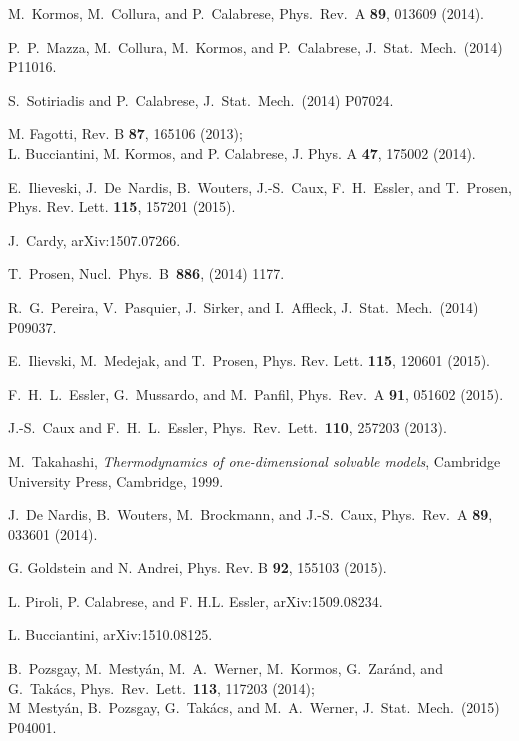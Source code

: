 \documentclass[11pt]{iopart}
\begin{document}
\begin{thebibliography}{99}
M.~Kormos, M.~Collura, and P.~Calabrese, Phys.\ Rev.\ A {\bf 89}, 013609  (2014).


P.~P.~Mazza, M.\ Collura, M.\ Kormos, and P.\ Calabrese, J.\ Stat.\ Mech.\   (2014) P11016.


S.~Sotiriadis and P.~Calabrese, J.\ Stat.\ Mech.\ (2014) P07024. 


M. Fagotti,  Rev. B {\bf 87}, 165106 (2013);\\
L. Bucciantini, M. Kormos, and P. Calabrese, J. Phys. A {\bf 47}, 175002 (2014).




E.~Ilieveski, J.~De~Nardis, B.~Wouters, J.-S.~Caux, F.~H.~Essler, and T.~Prosen, 
Phys. Rev. Lett. {\bf 115}, 157201 (2015). 


J.~Cardy,  arXiv:1507.07266.


T.~Prosen, Nucl.\ Phys.\ B\ {\bf 886}, (2014) 1177.


R.~G.~Pereira, V.~Pasquier, J.~Sirker, and I.~Affleck, J.\ Stat.\ Mech.\ 
(2014) P09037. 


E.~Ilievski, M.~Medejak, and T.~Prosen, Phys. Rev. Lett. {\bf 115}, 120601 (2015).


F.~H.~L.~Essler, G.~Mussardo, and M.~Panfil, Phys.\ Rev.\ A {\bf 91}, 051602 (2015). 


J.-S.~Caux and F.~H.~L.~Essler, Phys.\ Rev.\ Lett.\ {\bf 110}, 257203 (2013). 


M.~Takahashi, {\it Thermodynamics of one-dimensional solvable models}, 
Cambridge University Press, Cambridge, 1999. 


J.~De Nardis, B.~Wouters, M.~Brockmann, and J.-S.~Caux, Phys.\ Rev.\ A {\bf 89}, 033601 (2014). 


G. Goldstein and N. Andrei, Phys. Rev. B \textbf{92}, 155103 (2015).


L. Piroli, P. Calabrese, and F. H.L. Essler,
arXiv:1509.08234.


L. Bucciantini, arXiv:1510.08125.




B.~Pozsgay, M.~Mesty\'an, M.~A.~Werner, M.~Kormos, G.~Zar\'and, and G.~Tak\'acs,
Phys.\ Rev.\ Lett.\ {\bf 113}, 117203 (2014);\\
M~Mesty\'an, B.~Pozsgay, G.~Tak\'acs, and M.~A.~Werner, J.\ Stat.\ Mech.\ (2015)  P04001.



\end{thebibliography}
\end{document}
